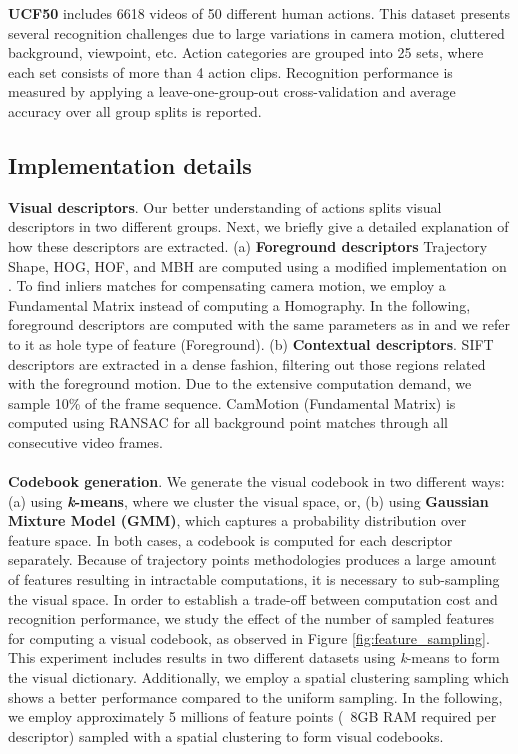 \textbf{UCF50} \cite{reddy2013} includes 6618 videos of 50 different human actions.  This dataset presents several recognition challenges due to large variations in camera motion, cluttered background, viewpoint, etc. Action categories are grouped into 25 sets, where each set consists of more than 4 action clips. Recognition performance is measured by applying a leave-one-group-out cross-validation and average accuracy over all group splits is reported. 

\subsection{Implementation details}

\textbf{Visual descriptors}. Our better understanding of actions splits visual descriptors in two different groups. Next, we briefly give a detailed explanation of how these descriptors are extracted.
(a) \textbf{Foreground descriptors} \ie Trajectory Shape, HOG, HOF, and MBH are computed using a modified implementation on \cite{wang2013}. To find inliers matches for compensating camera motion, we employ a Fundamental Matrix instead of computing a Homography. In the following, foreground descriptors are computed with the same parameters as in \cite{wang2013} and we refer to it as hole type of feature (Foreground).
(b) \textbf{Contextual descriptors}. SIFT descriptors are extracted in a dense fashion, filtering out those regions related with the foreground motion. Due to the extensive computation demand, we sample 10\% of the frame sequence. CamMotion (Fundamental Matrix) is computed using RANSAC for all background point matches through all consecutive video frames.\\\\
\textbf{Codebook generation}. We generate the visual codebook in two different ways: (a) using \textbf{\textit{k}-means}, where we cluster the visual space, or, (b) using \textbf{Gaussian Mixture Model (GMM)}, which captures a probability distribution over feature space. In both cases, a codebook is computed for each descriptor separately. Because of trajectory points methodologies produces a large amount of features resulting in intractable computations, it is necessary to sub-sampling the visual space. In order to establish a trade-off between computation cost and recognition performance, we study the effect of the number of sampled features for computing a visual codebook, as observed in Figure \ref{fig:feature_sampling}. This experiment includes results in two different datasets using \textit{k}-means to form the visual dictionary. Additionally, we employ a spatial clustering sampling which shows a better performance compared to the uniform sampling. In the following, we employ approximately 5 millions of feature points (~8GB RAM required per descriptor) sampled with a spatial clustering to form visual codebooks.\\\\
